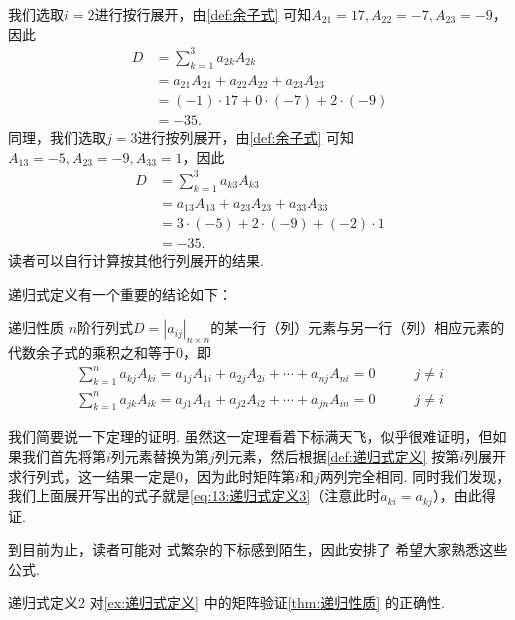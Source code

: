 \begin{solution}
    我们选取$i=2$进行按行展开，由\autoref{def:余子式} 可知$A_{21}=17,A_{22}=-7,A_{23}=-9$，因此
    \begin{align*}
        D & =\sum_{k=1}^{3}a_{2k}A_{2k}              \\
          & =a_{21}A_{21}+a_{22}A_{22}+a_{23}A_{23}  \\
          & =(-1) \cdot 17+0 \cdot (-7)+2 \cdot (-9) \\
          & =-35.
    \end{align*}
    同理，我们选取$j=3$进行按列展开，由\autoref{def:余子式} 可知$A_{13}=-5,A_{23}=-9,A_{33}=1$，因此
    \begin{align*}
        D & =\sum_{k=1}^{3}a_{k3}A_{k3}             \\
          & =a_{13}A_{13}+a_{23}A_{23}+a_{33}A_{33} \\
          & =3 \cdot (-5)+2 \cdot (-9)+(-2) \cdot 1 \\
          & =-35.
    \end{align*}
    读者可以自行计算按其他行列展开的结果.
\end{solution}

递归式定义有一个重要的结论如下：
\begin{theorem}{}{递归性质}
    $n$阶行列式$D=|a_{ij}|_{n \times n}$的某一行（列）元素与另一行（列）相应元素的代数余子式的乘积之和等于0，即
    \begin{align}
        \label{eq:13:递归式定义3}
        \sum_{k=1}^{n}a_{kj}A_{ki}=a_{1j}A_{1i}+a_{2j}A_{2i}+\cdots+a_{nj}A_{ni}=0 & \qquad j \neq i \\
        \label{eq:13:递归式定义4}
        \sum_{k=1}^{n}a_{jk}A_{ik}=a_{j1}A_{i1}+a_{j2}A_{i2}+\cdots+a_{jn}A_{in}=0 & \qquad j \neq i
    \end{align}
\end{theorem}

我们简要说一下定理的证明. 虽然这一定理看着下标满天飞，似乎很难证明，但如果我们首先将第$i$列元素替换为第$j$列元素，然后根据\autoref{def:递归式定义} 按第$i$列展开求行列式，这一结果一定是0，因为此时矩阵第$i$和$j$两列完全相同. 同时我们发现，我们上面展开写出的式子就是\autoref{eq:13:递归式定义3}（注意此时$a_{ki}=a_{kj}$），由此得证.

到目前为止，读者可能对 式繁杂的下标感到陌生，因此安排了 希望大家熟悉这些公式.
\begin{example}{}{递归式定义2}
    对\autoref{ex:递归式定义} 中的矩阵验证\autoref{thm:递归性质} 的正确性.
\end{example}

